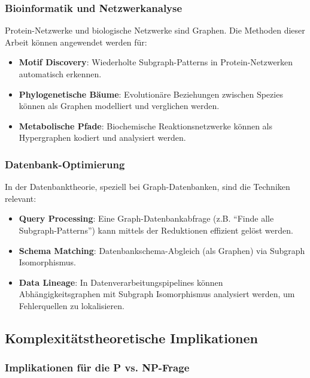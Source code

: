 ﻿\documentclass[a4paper,12pt]{article}
\theoremstyle{definition}
\begin{document}
\subsubsection{Bioinformatik und Netzwerkanalyse}

Protein-Netzwerke und biologische Netzwerke sind Graphen. Die Methoden dieser Arbeit können angewendet werden für:

\begin{itemize}
	\item \textbf{Motif Discovery}: Wiederholte Subgraph-Patterns in Protein-Netzwerken automatisch erkennen.
	
	\item \textbf{Phylogenetische Bäume}: Evolutionäre Beziehungen zwischen Spezies können als Graphen modelliert und verglichen werden.
	
	\item \textbf{Metabolische Pfade}: Biochemische Reaktionsnetzwerke können als Hypergraphen kodiert und analysiert werden.
\end{itemize}

\subsubsection{Datenbank-Optimierung}

In der Datenbanktheorie, speziell bei Graph-Datenbanken, sind die Techniken relevant:

\begin{itemize}
	\item \textbf{Query Processing}: Eine Graph-Datenbankabfrage (z.B. ``Finde alle Subgraph-Patterns'') kann mittels der Reduktionen effizient gelöst werden.
	
	\item \textbf{Schema Matching}: Datenbankschema-Abgleich (als Graphen) via Subgraph Isomorphismus.
	
	\item \textbf{Data Lineage}: In Datenverarbeitungspipelines können Abhängigkeitsgraphen mit Subgraph Isomorphismus analysiert werden, um Fehlerquellen zu lokalisieren.
\end{itemize}

\subsection{Komplexitätstheoretische Implikationen}

\subsubsection{Implikationen für die P vs. NP-Frage}
\end{document}
